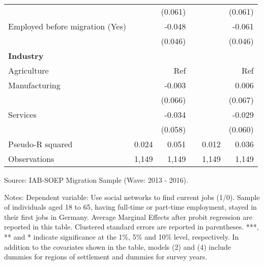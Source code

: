 \documentclass[12pt,a4paper]{article}
\begin{document}
\begin{table}[htbp]
{\begin{tabular}{p{15em}rrrrr}
    \multicolumn{1}{r}{} &       & (0.061) &       &       & (0.061) \\
    Employed before migration (Yes) &       & -0.048 &       &       & -0.061 \\
    \multicolumn{1}{r}{} &       & (0.046) &       &       & (0.046) \\
    \textbf{Industry} &       &       &       &       &  \\
    Agriculture &       & Ref   &       &       & Ref \\
    Manufacturing &       & -0.003 &       &       & 0.006 \\
    \multicolumn{1}{r}{} &       & (0.066) &       &       & (0.067) \\
    Services &       & -0.034 &       &       & -0.029 \\
    \multicolumn{1}{r}{} &       & (0.058) &       &       & (0.060) \\
    \multicolumn{1}{l}{Pseudo-R squared} & 0.024 & 0.051 &       & 0.012 & 0.036 \\
    Observations &       1,149    &        1,149    &       &            1,149    &            1,149    \\
    \bottomrule
    \end{tabular}%
}

\begin{tablenotes}
      \small
      \item Source: IAB-SOEP Migration Sample (Wave: 2013 - 2016).
      \item Notes: Dependent variable: Use social networks to find current jobs (1/0). Sample of individuals aged 18 to 65, having full-time or part-time employment, stayed in their first jobs in Germany. Average Marginal Effects after probit regression are reported in this table. Clustered standard errors are reported in parentheses.  ***, ** and * indicate significance at the 1\%, 5\% and 10\% level, respectively. In addition to the covariates shown in the table, models (2) and (4)  include dummies for regions of settlement and dummies for survey years.
    \end{tablenotes}
\end{table}%
\end{document}
